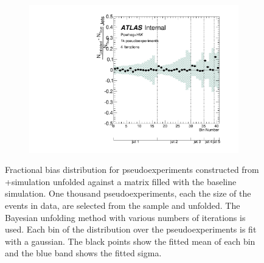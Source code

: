 \begin{figure}
\begin{subfigure}[]{0.5\textwidth}
\end{subfigure}
~
\begin{subfigure}[]{0.5\textwidth}
\includegraphics[width=\textwidth]{fig/Stress/105860atlfast/FracBias4Iterations.pdf}
\end{subfigure}
\caption{Fractional bias distribution for pseudoexperiments constructed from \pow+\hw simulation unfolded against a matrix filled with the baseline simulation. One thousand pseudoexperiments, each the size of the events in data, are selected from the sample and unfolded. The Bayesian unfolding method with various numbers of iterations is used. Each bin of the distribution over the pseudoexperiments is fit with a gaussian. The black points show the fitted mean of each bin and the blue band shows the fitted sigma. }
\label{fig:powhwfrbias}
\end{figure}
\clearpage


